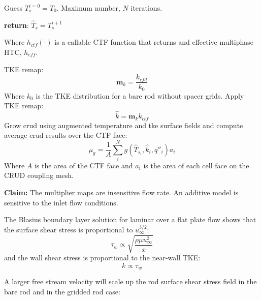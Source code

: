 \begin{itemize}
    \begin{algorithm}[H]
    Guess $T^{i=0}_s=T_0$.  Maximum number, $N$ iterations.

        \textbf{return}: $\hat T_s = T^{i+1}_s$
        \end{algorithm}
    Where $h_{ctf}(\cdot)$ is a callable CTF function that returns and effective multiphase HTC, $h_{eff}$.

    TKE remap:
    \begin{equation}
       \mathbf m_{k} = \frac{k_{cfd}}{k_{0}}
    \end{equation}
    Where $k_0$ is the TKE distribution for a bare rod without spacer grids.
    Apply TKE remap:
       \begin{equation}
       \hat k = \mathbf m_k k_{ctf}
       \end{equation}
     Grow crud using augmented temperature and tke surface fields and compute average crud results over the CTF face:
     \begin{equation}
     \mu_g = \frac{1}{A} \sum_i^N g(\hat T_{s_i}, \hat k_i, q''_i) a_i
     \end{equation}
    Where $A$ is the area of the CTF face and $a_i$ is the area of each cell face on the CRUD coupling mesh.

    \textbf{Claim:} The multiplier maps are insensitive flow rate.  An additive model is sensitive to the inlet flow conditions.

    The Blasius boundary layer solution for laminar over a flat plate flow shows that the surface shear stress is proportional to $u_\infty^{3/2}$:
\begin{equation}
        \tau_w \propto \sqrt{\frac{\rho \mu u_\infty^3}{x}}
\end{equation}
        and the wall shear stress is proportional to the near-wall TKE:
        \begin{equation}
        k \propto \tau_w
        \end{equation}

    A larger free stream velocity will scale up the rod surface shear stress field in the bare rod and in the gridded rod case:


\end{itemize}
